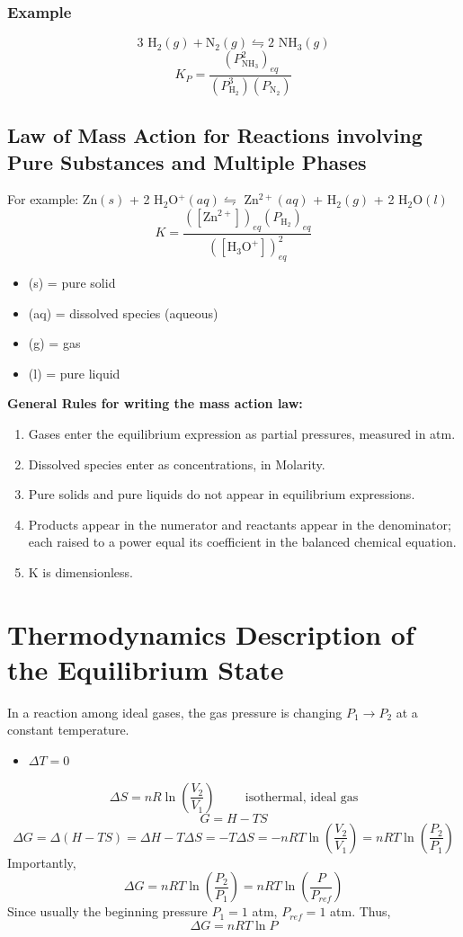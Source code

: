 \documentclass[10pt]{article}
\begin{document}
\subsubsection*{Example}
\[\text{3 H}_2(g) + \text{N}_2(g) \leftrightharpoons \text{2 NH}_3(g)\]
\[K_P = \frac{(P_{\text{NH}_3}^2)_{eq}}{(P_{\text{H}_2}^3)(P_{\text{N}_2})}\]

\subsection*{Law of Mass Action for Reactions involving Pure Substances and Multiple Phases}
For example: Zn$(s)$ + 2 H$_2$O$^+ (aq) \leftrightharpoons$ Zn$^{2+}(aq)$ + H$_2(g)$ + 2 H$_2$O$(l)$
\[K = \frac{([\text{Zn}^{2+}])_{eq}(P_{\text{H}_2})_{eq}}{([\text{H}_3\text{O}^+])^2_{eq}}\]
\begin{itemize}
    \item (s) = pure solid
    \item (aq) = dissolved species (aqueous)
    \item (g) = gas
    \item (l) = pure liquid
\end{itemize}
\textbf{General Rules for writing the mass action law:}
\begin{enumerate}
    \item Gases enter the equilibrium expression as partial pressures, measured in atm.
    \item Dissolved species enter as concentrations, in Molarity.
    \item Pure solids and pure liquids do not appear in equilibrium expressions.
    \item Products appear in the numerator and reactants appear in the denominator; each raised to a power equal its coefficient in the balanced chemical equation.
    \item K is dimensionless.
\end{enumerate}
\section*{Thermodynamics Description of the Equilibrium State}
In a reaction among ideal gases, the gas pressure is changing $P_1 \rightarrow P_2$ at a constant temperature.
\begin{itemize}
    \item $\Delta T = 0$
\end{itemize}
\[\Delta S = nR \ln \left(\frac{V_2}{V_1}\right) \hspace{1cm} \text{isothermal, ideal gas}\]
\[G = H - TS\]
\[\Delta G = \Delta (H - TS) = \Delta H - T \Delta S = -T \Delta S = -nRT\ln\left(\frac{V_2}{V_1}\right) = nRT\ln\left(\frac{P_2}{P_1}\right)\]
Importantly,
\[\Delta G = nRT\ln\left(\frac{P_2}{P_1}\right) = nRT\ln\left(\frac{P}{P_{ref}}\right)\]
Since usually the beginning pressure $P_1 = 1$ atm, $P_{ref} = 1$ atm.  Thus,
\[\Delta G = nRT\ln P\]
\end{document}
